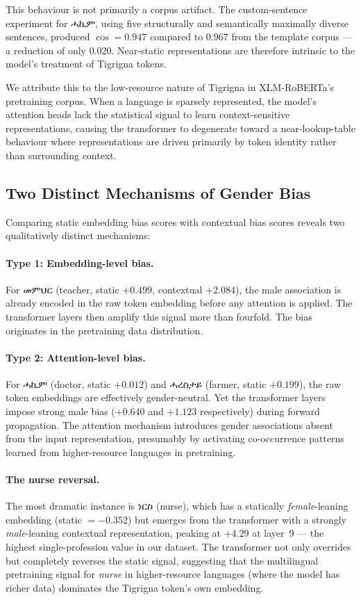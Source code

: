 \documentclass[11pt,a4paper]{article}
\begin{document}
This behaviour is not primarily a corpus artifact. The custom-sentence
experiment for {\ethiopicfont ሓኪም}, using five structurally and semantically maximally
diverse sentences, produced $\overline{\cos} = 0.947$ compared to $0.967$ from
the template corpus — a reduction of only $0.020$. Near-static representations
are therefore intrinsic to the model's treatment of Tigrigna tokens.

We attribute this to the low-resource nature of Tigrigna in XLM-RoBERTa's
pretraining corpus. When a language is sparsely represented, the model's
attention heads lack the statistical signal to learn context-sensitive
representations, causing the transformer to degenerate toward a near-lookup-table
behaviour where representations are driven primarily by token identity rather
than surrounding context.

\subsection{Two Distinct Mechanisms of Gender Bias}

Comparing static embedding bias scores with contextual bias scores reveals two
qualitatively distinct mechanisms:

\paragraph{Type 1: Embedding-level bias.}
For {\ethiopicfont መምህር} (teacher, static $+0.499$, contextual $+2.084$), the male
association is already encoded in the raw token embedding before any attention
is applied. The transformer layers then amplify this signal more than fourfold.
The bias originates in the pretraining data distribution.

\paragraph{Type 2: Attention-level bias.}
For {\ethiopicfont ሓኪም} (doctor, static $+0.012$) and {\ethiopicfont ሓረስታይ} (farmer, static
$+0.199$), the raw token embeddings are effectively gender-neutral. Yet the
transformer layers impose strong male bias ($+0.640$ and $+1.123$ respectively)
during forward propagation. The attention mechanism introduces gender
associations absent from the input representation, presumably by activating
co-occurrence patterns learned from higher-resource languages in pretraining.

\paragraph{The nurse reversal.}
The most dramatic instance is {\ethiopicfont ነርስ} (nurse), which has a statically
\emph{female}-leaning embedding (static $= -0.352$) but emerges from the
transformer with a strongly \emph{male}-leaning contextual representation,
peaking at $+4.29$ at layer~9 — the highest single-profession value in our
dataset. The transformer not only overrides but completely reverses the static
signal, suggesting that the multilingual pretraining signal for \textit{nurse}
in higher-resource languages (where the model has richer data) dominates the
Tigrigna token's own embedding.
\end{document}
